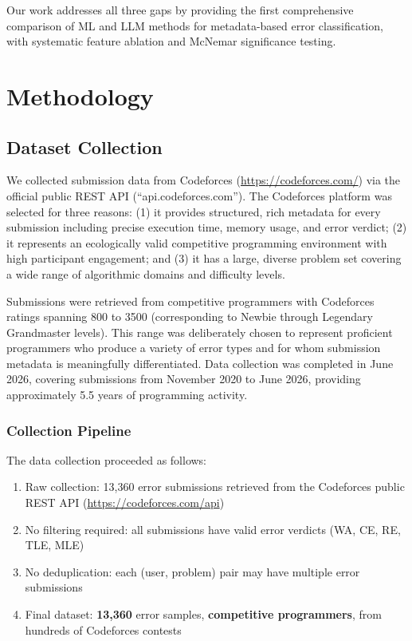 \documentclass[10pt,a4paper]{article}
\begin{document}
Our work addresses all three gaps by providing the first comprehensive comparison
of ML and LLM methods for metadata-based error classification, with systematic
feature ablation and McNemar significance testing.

\section{Methodology}

\subsection{Dataset Collection}

We collected submission data from Codeforces (\url{https://codeforces.com/})
via the official public REST API (``api.codeforces.com''). The Codeforces
platform was selected for three reasons: (1) it provides structured, rich
metadata for every submission including precise execution time, memory usage,
and error verdict; (2) it represents an ecologically valid competitive
programming environment with high participant engagement; and (3) it has a
large, diverse problem set covering a wide range of algorithmic domains and
difficulty levels.

Submissions were retrieved from competitive programmers with Codeforces
ratings spanning 800 to 3500 (corresponding to Newbie through Legendary
Grandmaster levels). This range was deliberately chosen to represent
proficient programmers who produce a variety of error types and for whom
submission metadata is meaningfully differentiated. Data collection was
completed in June 2026, covering submissions from November 2020 to June
2026, providing approximately 5.5 years of programming activity.

\subsubsection*{Collection Pipeline}
The data collection proceeded as follows:
\begin{enumerate}
    \item Raw collection: 13,360 error submissions retrieved from the Codeforces public REST API (\url{https://codeforces.com/api})
    \item No filtering required: all submissions have valid error verdicts (WA, CE, RE, TLE, MLE)
    \item No deduplication: each (user, problem) pair may have multiple error submissions
    \item Final dataset: \textbf{13,360} error samples, \textbf{competitive programmers}, from hundreds of Codeforces contests
\end{enumerate}
\end{document}
